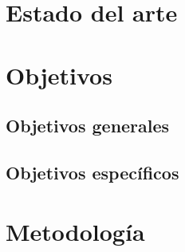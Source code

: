 \documentclass[../TFG.tex]{subfiles}
\begin{document}
\section{Estado del arte}

\lipsum[0-15]

\section{Objetivos}

\lipsum[5]

\subsection{Objetivos generales}

\lipsum[5]

\subsection{Objetivos específicos}

\lipsum[5]

\section{Metodología}

\lipsum[5]
\end{document}
